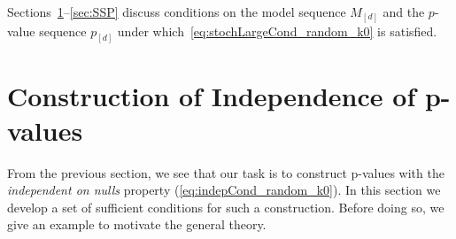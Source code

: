 \documentclass{article}
\begin{document}
Sections~\ref{sec:pValsIndep}--\ref{sec:SSP} discuss conditions on the model sequence $M_{[d]}$ and the $p$-value sequence $p_{[d]}$ under which~\eqref{eq:stochLargeCond_random_k0} is satisfied.



\section{Construction of Independence of p-values}\label{sec:pValsIndep}

From the previous section, we see that our task is to construct p-values with the {\it independent on nulls} property (\ref{eq:indepCond_random_k0}).
In this section we develop a set of sufficient conditions for such a construction. Before doing so, we give an example to motivate
the general theory. 
\end{document}
